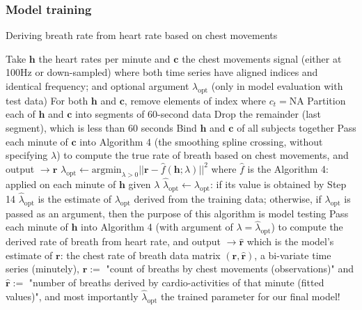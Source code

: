 \documentclass[
]{article}
\begin{document}
\hypertarget{model-training}{%
\subsubsection{Model training}\label{model-training}}

\begin{algorithm}
\caption{Deriving breath rate from heart rate based on chest movements}
\begin{algorithmic}[1]
\STATE Take $\mathbf{h}$ the heart rates per minute and $\mathbf{c}$ the chest movements signal (either at 100Hz or down-sampled) where both time series have aligned indices and identical frequency; and optional argument $\lambda_\text{opt}$ (only in model evaluation with test data)
\STATE For both $\mathbf{h}$ and $\mathbf{c}$, remove elements of index where $c_t = \text{NA}$
\STATE Partition each of $\mathbf{h}$ and $\mathbf{c}$ into segments of 60-second data
\ENDFOR
\STATE Drop the remainder (last segment), which is less than 60 seconds
\STATE Bind $\mathbf{h}$ and $\mathbf{c}$ of all subjects together
\ENDIF
{}
\STATE Pass each minute of $\mathbf{c}$ into Algorithm 4 (the smoothing spline crossing, without specifying $\lambda$) to compute the true rate of breath based on chest movements, and output $\rightarrow \mathbf{r}$
\ENDFOR
{}
\STATE $\lambda_\text{opt} \leftarrow \text{argmin}_{\lambda > 0} ||\mathbf{r} - \hat{f}(\mathbf{h}; \lambda)||^2$ where $\hat{f}$ is the Algorithm 4: applied on each minute of $\mathbf{h}$ given $\lambda$
\ENDIF
\STATE $\hat{\lambda}_\text{opt} \leftarrow \lambda_\text{opt}$: if its value is obtained by Step 14 $\hat{\lambda}_\text{opt}$ is the estimate of $\lambda_\text{opt}$ derived from the training data; otherwise, if $\lambda_\text{opt}$ is passed as an argument, then the purpose of this algorithm is model testing
\STATE Pass each minute of $\mathbf{h}$ into Algorithm 4 (with argument of $\lambda = \hat{\lambda}_\text{opt}$) to compute the derived rate of breath from heart rate, and output $\rightarrow \mathbf{\hat{r}}$ which is the model's estimate of $\mathbf{r}$: the chest rate of breath
\ENDFOR
\RETURN data matrix $(\mathbf{r}, \mathbf{\hat{r}})$, a bi-variate time series (minutely), $\mathbf{r} :=$ "count of breaths by chest movements (observations)" and $\mathbf{\hat{r}} :=$ "number of breaths derived by cardio-activities of that minute (fitted values)", and most importantly $\hat{\lambda}_\text{opt}$ the trained parameter for our final model!
\end{algorithmic}
\end{algorithm}
\end{document}

